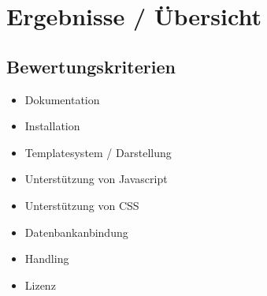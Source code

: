 \chapter{Ergebnisse / Übersicht }
\section{Bewertungskriterien}
\begin{itemize}
  \item Dokumentation
  \item Installation
  \item Templatesystem / Darstellung 
  \item Unterstützung von Javascript 
  \item Unterstützung von CSS
  \item Datenbankanbindung
  \item Handling
  \item Lizenz
\end{itemize}

